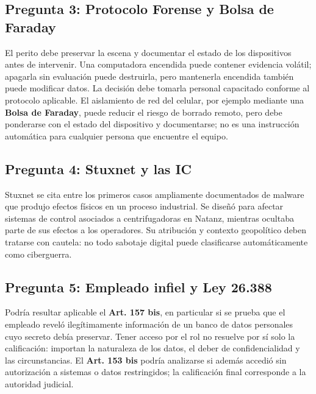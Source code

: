 \documentclass[11pt,a4paper]{article}
\begin{document}
\subsection*{Pregunta 3: Protocolo Forense y Bolsa de Faraday}
\begin{respuesta}
El perito debe preservar la escena y documentar el estado de los dispositivos antes de intervenir. Una computadora encendida puede contener evidencia volátil; apagarla sin evaluación puede destruirla, pero mantenerla encendida también puede modificar datos. La decisión debe tomarla personal capacitado conforme al protocolo aplicable. El aislamiento de red del celular, por ejemplo mediante una \textbf{Bolsa de Faraday}, puede reducir el riesgo de borrado remoto, pero debe ponderarse con el estado del dispositivo y documentarse; no es una instrucción automática para cualquier persona que encuentre el equipo.
\end{respuesta}

\subsection*{Pregunta 4: Stuxnet y las IC}
\begin{respuesta}
Stuxnet se cita entre los primeros casos ampliamente documentados de malware que produjo efectos físicos en un proceso industrial. Se diseñó para afectar sistemas de control asociados a centrifugadoras en Natanz, mientras ocultaba parte de sus efectos a los operadores. Su atribución y contexto geopolítico deben tratarse con cautela: no todo sabotaje digital puede clasificarse automáticamente como ciberguerra.
\end{respuesta}

\subsection*{Pregunta 5: Empleado infiel y Ley 26.388}
\begin{respuesta}
Podría resultar aplicable el \textbf{Art. 157 bis}, en particular si se prueba que el empleado reveló ilegítimamente información de un banco de datos personales cuyo secreto debía preservar. Tener acceso por el rol no resuelve por sí solo la calificación: importan la naturaleza de los datos, el deber de confidencialidad y las circunstancias. El \textbf{Art. 153 bis} podría analizarse si además accedió sin autorización a sistemas o datos restringidos; la calificación final corresponde a la autoridad judicial.
\end{respuesta}
\end{document}
